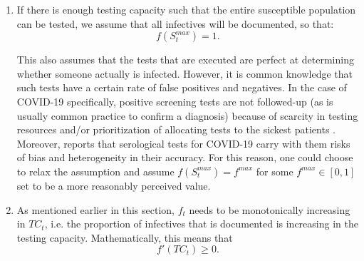 \documentclass[12pt]{article}
\begin{document}
\begin{enumerate}[label=(A\arabic*)]
		\item\label{ass:undoc_fN} If there is enough testing capacity such that the entire susceptible population can be tested, we assume that all infectives will be documented, so that:
		    \[f(S^{max}_t) = 1.\]
		    
		\noindent This also assumes that the tests that are executed are perfect at determining whether someone actually is infected. However, it is common knowledge that such tests have a certain rate of false positives and negatives. In the case of COVID-19 specifically, positive screening tests are not followed-up (as is usually common practice to confirm a diagnosis) because of scarcity in testing resources and/or prioritization of allocating tests to the sickest patients \parencite{frasier2020tests}. Moreover, \textcite{bmj2020testaccuracy} reports that serological tests for COVID-19 carry with them risks of bias and heterogeneity in their accuracy. %
		For this reason, one could choose to relax the assumption and assume $f(S^{max}_t) = f^{max}$ for some $f^{max} \in [0,1]$ set to be a more reasonably perceived value.
		
		\item\label{ass:undoc_monotonicity} As mentioned earlier in this section, $f_t$ needs to be monotonically increasing in $TC_t$, i.e. the proportion of infectives that is documented is increasing in the testing capacity. Mathematically, this means that
		    \[f'(TC_t) \geq 0.\]
	\end{enumerate}
	
\end{document}
